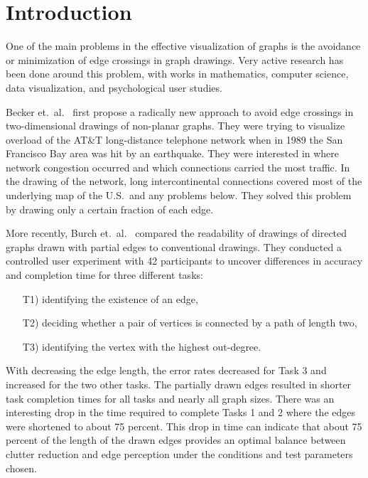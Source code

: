 \chapter{Introduction}

One of the main problems in the effective visualization of graphs is the avoidance or minimization of edge crossings in graph drawings. Very active research has been done around this problem, with works in mathematics, computer science, data visualization, and psychological user studies.

Becker et.\ al.~\cite{Becker} first propose a radically new approach to avoid edge crossings in two-dimensional drawings of non-planar graphs. They were trying to visualize overload of the AT\&T long-distance telephone network when in 1989 the San Francisco Bay area was hit by an earthquake. They were interested in where network congestion occurred and which connections carried the most traffic. In the drawing of the network, long intercontinental connections covered most of the underlying map of the U.S.\ and any problems below. They solved this problem by drawing only a certain fraction of each edge.

More recently, Burch et.\ al.~\cite{Burch} compared the readability of drawings of directed graphs drawn with partial edges to conventional drawings. They conducted a controlled user experiment with 42 participants to uncover differences in accuracy and completion time for three different tasks: 
\begin{itemize}
	\item [T1)] identifying the existence of an edge, 
	\item [T2)] deciding whether a pair of vertices is connected by a path of length two,
	\item [T3)] identifying the vertex with the highest out-degree.
\end{itemize}
With decreasing the edge length, the error rates decreased for Task 3 and increased for the two other tasks. The partially drawn edges resulted in shorter task completion times for all tasks and nearly all graph sizes. There was an interesting drop in the time required to complete Tasks 1 and 2 where the edges were shortened to about 75 percent. This drop in time can indicate that about 75 percent of the length of the drawn edges provides an optimal balance between clutter reduction and edge perception under the conditions and test parameters chosen.


